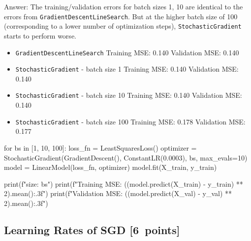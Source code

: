 \documentclass{article}
\newenvironment{answer}{\par\begingroup\color{gre}Answer: }{\endgroup}
\newcommand\pts[1]{\textcolor{pointscolour}{[#1~points]}}
\begin{document}
\begin{answer}
    The training/validation errors for batch sizes 1, 10 are identical to the errors from \texttt{GradientDescentLineSearch}. But at the higher batch size of 100 (corresponding to a lower number of optimization steps), \texttt{StochasticGradient} starts to perform worse.
    \begin{itemize}
        \item \texttt{GradientDescentLineSearch}
        \subitem Training MSE: 0.140
        \subitem Validation MSE: 0.140
        \item \texttt{StochasticGradient} - batch size 1
        \subitem Training MSE: 0.140
        \subitem Validation MSE: 0.140
        \item \texttt{StochasticGradient} - batch size 10
        \subitem Training MSE: 0.140
        \subitem Validation MSE: 0.140
        \item \texttt{StochasticGradient} - batch size 100
        \subitem Training MSE: 0.178
        \subitem Validation MSE: 0.177
    \end{itemize}

\end{answer}
\vspace{5mm}
\begin{python}
for bs in [1, 10, 100]:
    loss_fn = LeastSquaresLoss()
    optimizer = StochasticGradient(GradientDescent(), ConstantLR(0.0003), bs, max_evals=10)
    model = LinearModel(loss_fn, optimizer)
    model.fit(X_train, y_train)

    print(f"\nBatch size: {bs}")
    print(f"Training MSE: {((model.predict(X_train) - y_train) ** 2).mean():.3f}")
    print(f"Validation MSE: {((model.predict(X_val) - y_val) ** 2).mean():.3f}")
\end{python}

\subsection{Learning Rates of SGD \pts{6}}
\end{document}
